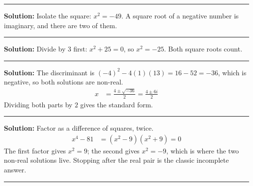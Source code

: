 \documentclass[12pt]{article}
\begin{document}



\vspace{0.3cm}
\noindent\rule{\linewidth}{0.4pt}
\vspace{0.2cm}


\textbf{Solution:} Isolate the square: $x^{2} = -49$. A square root of a
negative number is imaginary, and there are two of them. 

\vspace{0.15cm}
\noindent\rule{\linewidth}{0.2pt}


\textbf{Solution:} Divide by $3$ first: $x^{2} + 25 = 0$, so $x^{2} = -25$.
Both square roots count. 

\vspace{0.15cm}
\noindent\rule{\linewidth}{0.2pt}


\textbf{Solution:} The discriminant is $(-4)^{2} - 4(1)(13) = 16 - 52 = -36$,
which is negative, so both solutions are non-real.
\begin{align*}
  x &= \frac{4 \pm \sqrt{-36}}{2} = \frac{4 \pm 6i}{2}
\end{align*}
Dividing both parts by $2$ gives the standard form. 

\vspace{0.15cm}
\noindent\rule{\linewidth}{0.2pt}


\textbf{Solution:} Factor as a difference of squares, twice.
\begin{align*}
  x^{4} - 81 &= (x^{2} - 9)(x^{2} + 9) = 0
\end{align*}
The first factor gives $x^{2} = 9$; the second gives $x^{2} = -9$, which is
where the two non-real solutions live. Stopping after the real pair is the
classic incomplete answer. 

\vspace{0.15cm}
\noindent\rule{\linewidth}{0.2pt}

\end{document}

